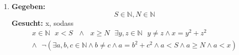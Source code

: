 \documentclass[a4paper]{article}
\begin{document}
\begin{enumerate}
		\item
		\textbf{Gegeben:}
		\begin{equation*}
			S \in \mathbb{N}, N \in \mathbb{N}
		\end{equation*}
		\textbf{Gesucht: } x, sodass
		\begin{equation*}
			\begin{aligned}
				x \in \mathbb{N} \text{ } x < S \text{ } \land \text{ } x \geq N \text{ } \exists y, z \in \mathbb{N} \text{ } y \neq z \land x = y^{2} + z^{2} \\ \land \text{ } \lnot (\exists a, b, c \in \mathbb{N} \land b \neq c \land a = b^{2} + c^{2} \land a < S \land a \geq N \land a < x)
			\end{aligned}
		\end{equation*}
	\end{enumerate}
\end{document}
